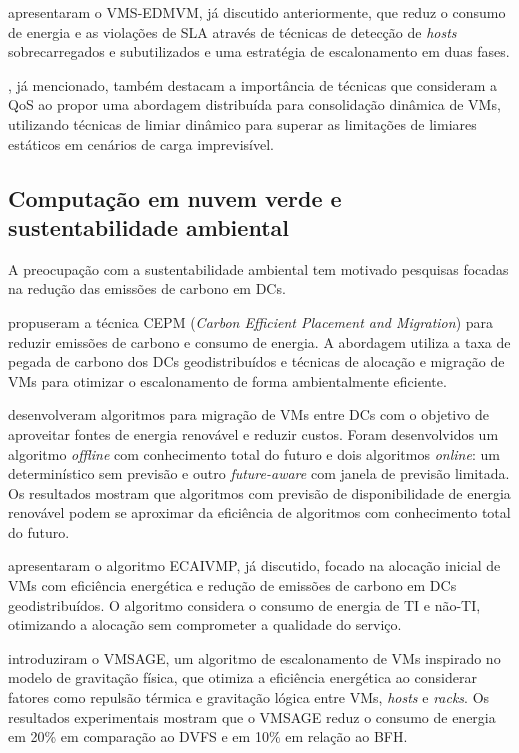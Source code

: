 \documentclass[
	12pt,				%
	oneside,			%
	a4paper,			%
	english,			%
	brazil				%
	]{abntex2ppgsi}
\begin{document}
 apresentaram o VMS-EDMVM, já discutido anteriormente, que reduz o consumo de energia e as violações de SLA através de técnicas de detecção de \textit{hosts} sobrecarregados e subutilizados e uma estratégia de escalonamento em duas fases.

, já mencionado, também destacam a importância de técnicas que consideram a QoS ao propor uma abordagem distribuída para consolidação dinâmica de VMs, utilizando técnicas de limiar dinâmico para superar as limitações de limiares estáticos em cenários de carga imprevisível.

\subsection{Computação em nuvem verde e sustentabilidade ambiental}

A preocupação com a sustentabilidade ambiental tem motivado pesquisas focadas na redução das emissões de carbono em DCs.

 propuseram a técnica CEPM (\textit{Carbon Efficient Placement and Migration}) para reduzir emissões de carbono e consumo de energia. A abordagem utiliza a taxa de pegada de carbono dos DCs geodistribuídos e técnicas de alocação e migração de VMs para otimizar o escalonamento de forma ambientalmente eficiente.

 desenvolveram algoritmos para migração de VMs entre DCs com o objetivo de aproveitar fontes de energia renovável e reduzir custos. Foram desenvolvidos um algoritmo \textit{offline} com conhecimento total do futuro e dois algoritmos \textit{online}: um determinístico sem previsão e outro \textit{future-aware} com janela de previsão limitada. Os resultados mostram que algoritmos com previsão de disponibilidade de energia renovável podem se aproximar da eficiência de algoritmos com conhecimento total do futuro.

 apresentaram o algoritmo ECAIVMP, já discutido, focado na alocação inicial de VMs com eficiência energética e redução de emissões de carbono em DCs geodistribuídos. O algoritmo considera o consumo de energia de TI e não-TI, otimizando a alocação sem comprometer a qualidade do serviço.

 introduziram o VMSAGE, um algoritmo de escalonamento de VMs inspirado no modelo de gravitação física, que otimiza a eficiência energética ao considerar fatores como repulsão térmica e gravitação lógica entre VMs, \textit{hosts} e \textit{racks}. Os resultados experimentais mostram que o VMSAGE reduz o consumo de energia em 20\% em comparação ao DVFS e em 10\% em relação ao BFH.
\end{document}
